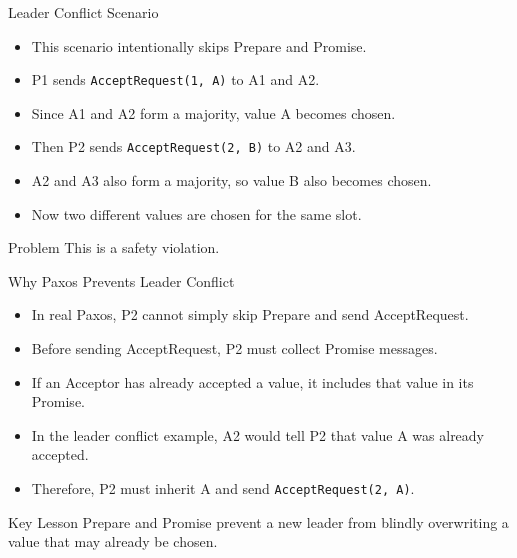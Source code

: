 \documentclass[aspectratio=169]{beamer}
\begin{document}
\begin{frame}{Leader Conflict Scenario}
  \begin{itemize}
    \item This scenario intentionally skips Prepare and Promise.
    \item P1 sends \texttt{AcceptRequest(1, A)} to A1 and A2.
    \item Since A1 and A2 form a majority, value A becomes chosen.
    \item Then P2 sends \texttt{AcceptRequest(2, B)} to A2 and A3.
    \item A2 and A3 also form a majority, so value B also becomes chosen.
    \item Now two different values are chosen for the same slot.
  \end{itemize}

  \begin{block}{Problem}
    This is a safety violation.
  \end{block}
\end{frame}

\begin{frame}{Why Paxos Prevents Leader Conflict}
  \begin{itemize}
    \item In real Paxos, P2 cannot simply skip Prepare and send AcceptRequest.
    \item Before sending AcceptRequest, P2 must collect Promise messages.
    \item If an Acceptor has already accepted a value, it includes that value in its Promise.
    \item In the leader conflict example, A2 would tell P2 that value A was already accepted.
    \item Therefore, P2 must inherit A and send \texttt{AcceptRequest(2, A)}.
  \end{itemize}

  \begin{block}{Key Lesson}
    Prepare and Promise prevent a new leader from blindly overwriting a value that may already be chosen.
  \end{block}
\end{frame}
\end{document}

